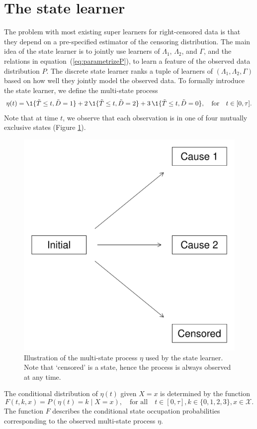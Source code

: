 \documentclass[a4,danish]{article}
\begin{document}
\section{The state learner}
\label{sec:super-learner-simple}

The problem with most existing super learners for right-censored data is that
they depend on a pre-specified estimator of the censoring distribution. The main
idea of the state learner is to jointly use learners of \( \Lambda_1 \),
\( \Lambda_2 \), and \( \Gamma \), and the relations in
equation~(\ref{eq:parametrizeP}), to learn a feature of the observed data
distribution \( P \). The discrete state learner ranks a tuple of learners of
\( (\Lambda_1, \Lambda_2, \Gamma) \) based on how well they jointly model the
observed data. To formally introduce the state learner, we define the
multi-state process
\begin{equation*}
  \eta(t) = \1\{\tilde{T} \leq t, \tilde D=1\} + 2\,\1\{\tilde{T} \leq t, \tilde D=2\}+ 3\,\1\{\tilde{T} \leq t, \tilde D=0\},
  \quad \text{for} \quad t \in [0, \tau].
\end{equation*}
Note that at time \(t\), we observe that each observation is in one of four
mutually exclusive states (Figure \ref{fig:multi-state-process}).
\begin{figure}[h]
  \centering
  \includegraphics[width=.5\textwidth]{./figures/figure-multi-state-process.pdf}
  \caption{Illustration of the multi-state process \(\eta\) used by
    the state learner. Note that `censored' is a state, hence the
    process is always observed at any time.}
  \label{fig:multi-state-process}
\end{figure}
The conditional distribution of \( \eta(t) \) given \( X=x \) is
determined by the function
\begin{equation}
  \label{eq:F-def}
  F(t, k, x) = P(\eta(t) = k \mid X=x),
  \quad \text{for all} \quad
  t \in [0,\tau],
  k \in \{0,1,2,3\},
  x \in \mathcal{X}.
\end{equation}
The function \( F \) describes the conditional state occupation
probabilities corresponding to the observed multi-state process
\(\eta\).
\end{document}
